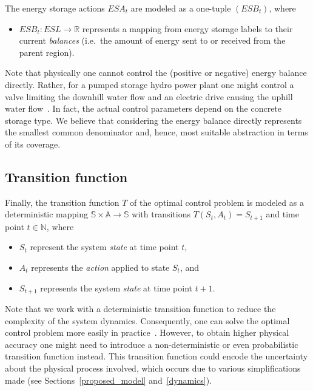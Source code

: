 The energy storage actions $ESA_t$ are modeled as a one-tuple $(ESB_t)$, where
\begin{itemize}
	\item $ESB_t: ESL \rightarrow \mathbb{R}$ represents a mapping from energy storage labels to their current \textit{balances} (i.e.\ the amount of energy sent to or received from the parent region).
\end{itemize}
Note that physically one cannot control the (positive or negative) energy balance directly. Rather, for a pumped storage hydro power plant one might control a valve limiting the downhill water flow and an electric drive causing the uphill water flow~\cite{Castronuovo2004}. In fact, the actual control parameters depend on the concrete storage type. We believe that considering the energy balance directly represents the smallest common denominator and, hence, most suitable abstraction in terms of its coverage.

\subsection{Transition function}
\label{transitions}

Finally, the transition function $T$ of the optimal control problem is modeled as a deterministic mapping $\mathbb{S} \times \mathbb{A} \rightarrow \mathbb{S}$ with transitions $T(S_t, A_t) = S_{t+1}$ and time point $t \in \mathbb{N}$, where
\begin{itemize}
	\item $S_t$ represent the system \textit{state} at time point $t$,
	\item $A_t$ represents the \textit{action} applied to state $S_t$, and
	\item $S_{t+1}$ represents the system \textit{state} at time point $t+1$.
\end{itemize}
Note that we work with a deterministic transition function to reduce the complexity of the system dynamics. Consequently, one can solve the optimal control problem more easily in practice~\cite{Bertsekas1995}. However, to obtain higher physical accuracy one might need to introduce a non-deterministic or even probabilistic transition function instead. This transition function could encode the uncertainty about the physical process involved, which occurs due to various simplifications made (see Sections~\ref{proposed_model} and~\ref{dynamics}).

